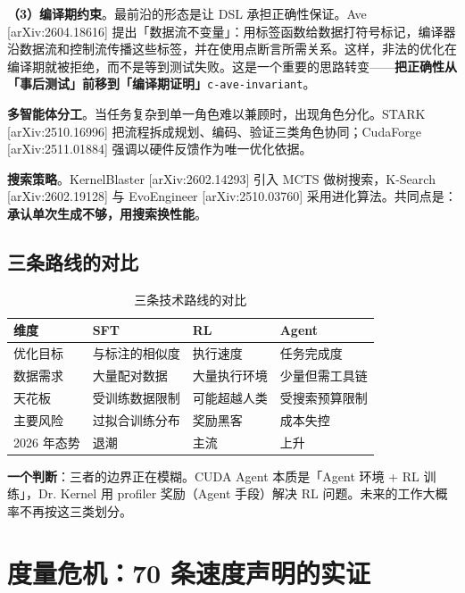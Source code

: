 \textbf{（3）编译期约束}。最前沿的形态是让 DSL 承担正确性保证。Ave [arXiv:2604.18616] 提出「数据流不变量」：用标签函数给数据打符号标记，编译器沿数据流和控制流传播这些标签，并在使用点断言所需关系。这样，非法的优化在编译期就被拒绝，而不是等到测试失败。这是一个重要的思路转变——\textbf{把正确性从「事后测试」前移到「编译期证明」}{\scriptsize\texttt{c-\hspace{0pt}ave-\hspace{0pt}invariant}}。


\textbf{多智能体分工}。当任务复杂到单一角色难以兼顾时，出现角色分化。STARK [arXiv:2510.16996] 把流程拆成规划、编码、验证三类角色协同；CudaForge [arXiv:2511.01884] 强调以硬件反馈作为唯一优化依据。


\textbf{搜索策略}。KernelBlaster [arXiv:2602.14293] 引入 MCTS 做树搜索，K-Search [arXiv:2602.19128] 与 EvoEngineer [arXiv:2510.03760] 采用进化算法。共同点是：\textbf{承认单次生成不够，用搜索换性能}。


\subsection{三条路线的对比}

\begin{table}[t]
\centering
\footnotesize
\setlength{\tabcolsep}{4pt}
\caption{三条技术路线的对比}
\label{tab:3}
\begin{tabular}{llll}
\toprule
维度 & SFT & RL & Agent \\
\midrule
优化目标 & 与标注的相似度 & 执行速度 & 任务完成度 \\
数据需求 & 大量配对数据 & 大量执行环境 & 少量但需工具链 \\
天花板 & 受训练数据限制 & 可能超越人类 & 受搜索预算限制 \\
主要风险 & 过拟合训练分布 & 奖励黑客 & 成本失控 \\
2026 年态势 & 退潮 & 主流 & 上升 \\
\bottomrule
\end{tabular}
\end{table}



\textbf{一个判断}：三者的边界正在模糊。CUDA Agent 本质是「Agent 环境 + RL 训练」，Dr. Kernel 用 profiler 奖励（Agent 手段）解决 RL 问题。未来的工作大概率不再按这三类划分。


\section{度量危机：70 条速度声明的实证}

